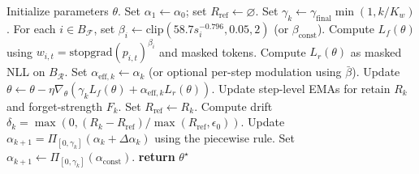   \begin{algorithm}[H]
  \caption{Ada-WGD}
  \begin{algorithmic}[1]
  \STATE Initialize parameters $\theta$.
  \STATE Set $\alpha_1\leftarrow \alpha_0$; set $R_{\mathrm{ref}}\leftarrow \varnothing$.
    \STATE Set $\gamma_k \leftarrow \gamma_{\mathrm{final}}\min(1,k/K_w)$.
      \STATE For each $i\in B_{\mathcal{F}}$, set $\beta_i \leftarrow \mathrm{clip}(58.7 s_i^{-0.796},0.05,2)$ (or $\beta_{\mathrm{const}}$).
      \STATE Compute $L_f(\theta)$ using $w_{i,t}=\mathrm{stopgrad}(p_{i,t})^{\beta_i}$ and masked tokens.
      \STATE Compute $L_r(\theta)$ as masked NLL on $B_{\mathcal{R}}$.
      \STATE Set $\alpha_{\mathrm{eff},k}\leftarrow \alpha_k$ (or optional per-step modulation using $\bar{\beta}$).
      \STATE Update $\theta\leftarrow\theta-\eta\nabla_\theta(\gamma_k L_f(\theta)+\alpha_{\mathrm{eff},k}L_r(\theta))$.
      \STATE Update step-level EMAs for retain $R_k$ and forget-strength $F_k$.
    \ENDFOR
      \STATE Set $R_{\mathrm{ref}}\leftarrow R_k$.
    \ENDIF
    \STATE Compute drift $\delta_k=\max(0,(R_k-R_{\mathrm{ref}})/\max(R_{\mathrm{ref}},\epsilon_0))$.
      \STATE Update $\alpha_{k+1}=\Pi_{[0,\gamma_k]}(\alpha_k+\Delta\alpha_k)$ using the piecewise rule.
    \ELSE
      \STATE Set $\alpha_{k+1}\leftarrow \Pi_{[0,\gamma_k]}(\alpha_{\mathrm{const}})$.
    \ENDIF
  \ENDFOR
  \STATE \textbf{return} $\theta^\star$
  \end{algorithmic}
  \end{algorithm}

  

